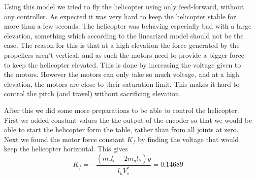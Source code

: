 \iffalse
Linearizing the system gives

\begin{subequations}
	\begin{align}
		\ddot{\tilde p} &= \partialderiv{\ddot{\tilde{p}}}{\tilde p} + \partialderiv{\ddot{\tilde p}}{\tilde e} + \partialderiv{\ddot{\tilde p}}{\tilde \lambda} + \partialderiv{\ddot{\tilde p}}{\tilde V_s} + \partialderiv{\ddot{\tilde p}}{\tilde V_d} = 0 + 0 + 0 + 0 + \frac{L_1}{J_p} \tilde V_d = \frac{L_1}{J_p} \tilde V_d = K_1 \tilde V_d\\
		\ddot{\tilde e} &= \partialderiv{\ddot{\tilde{e}}}{\tilde p} + \partialderiv{\ddot{\tilde{e}}}{\tilde e} + \partialderiv{\ddot{\tilde{e}}}{\tilde \lambda} + \partialderiv{\ddot{\tilde e}}{\tilde V_s} + \partialderiv{\ddot{\tilde e}}{\tilde V_d} = 0 + 0 + 0 + \frac{L_3}{J_e} \tilde V_s + 0 = \frac{L_3}{J_e} \tilde V_s = K_2 \tilde V_s\\
		\ddot{\tilde \lambda} &= \partialderiv{\ddot{\tilde \lambda}}{\tilde p} + \partialderiv{\ddot{\tilde \lambda}}{\tilde p} + \partialderiv{\ddot{\tilde \lambda}}{\tilde \lambda} + \partialderiv{\ddot{\tilde \lambda}}{\tilde V_s} + \partialderiv{\ddot{\tilde \lambda}}{\tilde V_d} = -\frac{L_2}{J_{\lambda}} \tilde p + 0 + 0 + 0 + 0 = -\frac{L_2}{J_{\lambda}} \tilde p = K_3 \tilde p 
	\end{align}
\end{subequations}
\fi

Using this model we tried to fly the helicopter using only feed-forward, without any controller. As expected it was very hard to keep the helicopter stable for more than a few seconds. The helicopter was behaving especially bad with a large elevation, something which according to the linearized model should not be the case. The reason for this is that at a high elevation the force generated by the propellers aren't vertical, and as such the motors need to provide a bigger force to keep the helicopter elevated. This is done by increasing the voltage given to the motors. However the motors can only take so much voltage, and at a high elevation, the motors are  close to their saturation limit. This makes it hard to control the pitch (and travel) without sacrificing elevation.

After this we did some more preparations to be able to control the helicopter. First we added constant values the the output of the encoder so that we would be able to start the helicopter form the table, rather than from all joints at zero. Next we found the motor force constant $K_f$ by finding the voltage that would keep the helicopter horizontal. This gives
\begin{equation}
	K_f = -\frac{(m_cl_c-2m_pl_h)g}{l_hV_s^*} = 0.14689
\end{equation}